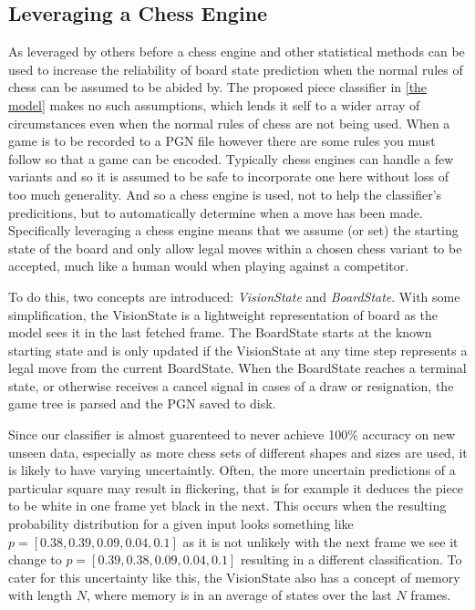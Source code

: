 \subsection{Leveraging a Chess Engine}
As leveraged by others before \cite{} a chess engine and other statistical methods \cite{} can be used to increase the reliability of board state 
prediction when the normal rules of chess can be assumed to be abided by.  The proposed piece classifier in \ref{the model} makes no such assumptions, which
lends it self to a wider array of circumstances even when the normal rules of chess are not being used.
When a game is to be recorded to a PGN file however there are some rules you must follow so that a game can be encoded.  Typically chess engines can handle a few
variants and so it is assumed to be safe to incorporate one here without loss of too much generality.  And so a chess engine is used, not to help the 
classifier's predicitions, but to automatically determine when a move has been made.
Specifically leveraging a chess engine means that we assume (or set) the starting state of the board and only allow legal moves within a chosen chess variant to be 
accepted, much like a human would when playing against a competitor.  

To do this, two concepts are introduced: \textit{VisionState} and \textit{BoardState}.  With some simplification, the VisionState is a lightweight 
representation of board as the model sees it in the last fetched frame.  The BoardState starts at the known starting state and is only updated if the VisionState at 
any time step represents a legal move from the current BoardState.  When the BoardState reaches a terminal state, or otherwise receives a cancel signal in cases of a 
draw or resignation, the game tree is parsed and the PGN saved to disk.

Since our classifier is almost guarenteed to never achieve 100\% accuracy on new unseen data, especially as more chess sets of different shapes and sizes are used, it 
is likely to have varying uncertaintly.  Often, the more uncertain predictions of a particular square may result in flickering, that is for example it deduces the piece to 
be white in one frame yet black in the next.  This occurs when the resulting probability distribution for a given input looks something like 
$p = [0.38, 0.39, 0.09, 0.04, 0.1]$ as it is not unlikely with the next frame we see it change to $p = [0.39, 0.38, 0.09, 0.04, 0.1]$ resulting in a different classification.
To cater for this uncertainty like this, the VisionState also has a concept of memory with length $N$, where memory is in an average of states 
over the last $N$ frames.

